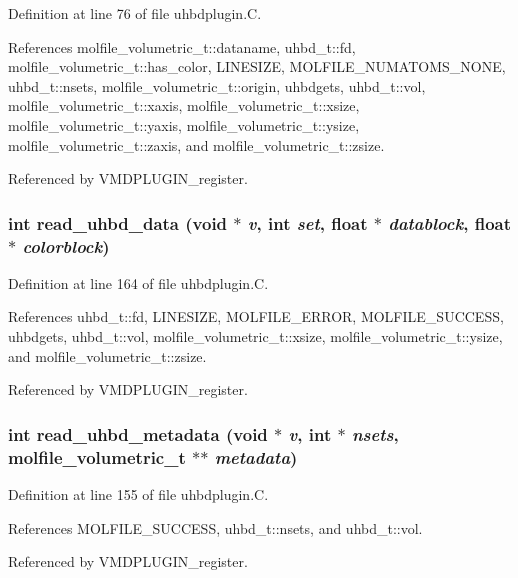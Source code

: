 Definition at line 76 of file uhbdplugin.C.

References molfile\_\-volumetric\_\-t::dataname, uhbd\_\-t::fd, molfile\_\-volumetric\_\-t::has\_\-color, LINESIZE, MOLFILE\_\-NUMATOMS\_\-NONE, uhbd\_\-t::nsets, molfile\_\-volumetric\_\-t::origin, uhbdgets, uhbd\_\-t::vol, molfile\_\-volumetric\_\-t::xaxis, molfile\_\-volumetric\_\-t::xsize, molfile\_\-volumetric\_\-t::yaxis, molfile\_\-volumetric\_\-t::ysize, molfile\_\-volumetric\_\-t::zaxis, and molfile\_\-volumetric\_\-t::zsize.

Referenced by VMDPLUGIN\_\-register.
\subsubsection{\setlength{\rightskip}{0pt plus 5cm}int read\_\-uhbd\_\-data (void $\ast$ {\em v}, int {\em set}, float $\ast$ {\em datablock}, float $\ast$ {\em colorblock})\hspace{0.3cm}{\tt  [static]}}\label{uhbdplugin_8C_a5}




Definition at line 164 of file uhbdplugin.C.

References uhbd\_\-t::fd, LINESIZE, MOLFILE\_\-ERROR, MOLFILE\_\-SUCCESS, uhbdgets, uhbd\_\-t::vol, molfile\_\-volumetric\_\-t::xsize, molfile\_\-volumetric\_\-t::ysize, and molfile\_\-volumetric\_\-t::zsize.

Referenced by VMDPLUGIN\_\-register.
\subsubsection{\setlength{\rightskip}{0pt plus 5cm}int read\_\-uhbd\_\-metadata (void $\ast$ {\em v}, int $\ast$ {\em nsets}, {\bf molfile\_\-volumetric\_\-t} $\ast$$\ast$ {\em metadata})\hspace{0.3cm}{\tt  [static]}}\label{uhbdplugin_8C_a4}




Definition at line 155 of file uhbdplugin.C.

References MOLFILE\_\-SUCCESS, uhbd\_\-t::nsets, and uhbd\_\-t::vol.

Referenced by VMDPLUGIN\_\-register.
